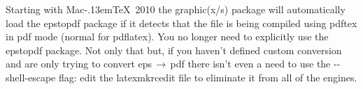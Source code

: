 \documentclass[11pt]{article}
\newcommand{\cmd}[1]{\textsf{#1}}
\newcommand{\To}{\,\(\to\)\,}
\newcommand{\MacTeX}{Mac\kern-.13em\TeX}
\begin{document}
Starting with \MacTeX\ 2010 the \cmd{graphic(x/s)} package will automatically load the \cmd{epstopdf} package if it detects that the file is being compiled using \cmd{pdftex} in \cmd{pdf} mode (normal for \cmd{pdflatex}). You no longer need to explicitly use the \cmd{epstopdf} package. Not only that but, if you haven't defined custom conversion and are only trying to convert \cmd{eps}\To\cmd{pdf} there isn't even a need to use the \cmd{-{}-shell-escape} flag: edit the \cmd{latexmkrcedit} file to eliminate it from all of the engines.


\end{document}
